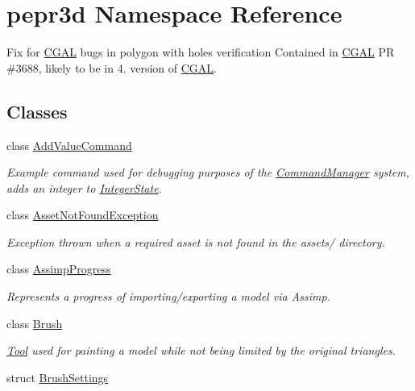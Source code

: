 \hypertarget{namespacepepr3d}{}\section{pepr3d Namespace Reference}
\label{namespacepepr3d}


Fix for \mbox{\hyperlink{namespace_c_g_a_l}{C\+G\+AL}} bugs in polygon with holes verification Contained in \mbox{\hyperlink{namespace_c_g_a_l}{C\+G\+AL}} PR \#3688, likely to be in 4. version of \mbox{\hyperlink{namespace_c_g_a_l}{C\+G\+AL}}.  


\subsection*{Classes}
\begin{DoxyCompactItemize}
\item 
class \mbox{\hyperlink{classpepr3d_1_1_add_value_command}{Add\+Value\+Command}}
\begin{DoxyCompactList}\small\item\em Example command used for debugging purposes of the \mbox{\hyperlink{classpepr3d_1_1_command_manager}{Command\+Manager}} system, adds an integer to \mbox{\hyperlink{structpepr3d_1_1_integer_state}{Integer\+State}}. \end{DoxyCompactList}\item 
class \mbox{\hyperlink{classpepr3d_1_1_asset_not_found_exception}{Asset\+Not\+Found\+Exception}}
\begin{DoxyCompactList}\small\item\em Exception thrown when a required asset is not found in the assets/ directory. \end{DoxyCompactList}\item 
class \mbox{\hyperlink{classpepr3d_1_1_assimp_progress}{Assimp\+Progress}}
\begin{DoxyCompactList}\small\item\em Represents a progress of importing/exporting a model via Assimp. \end{DoxyCompactList}\item 
class \mbox{\hyperlink{classpepr3d_1_1_brush}{Brush}}
\begin{DoxyCompactList}\small\item\em \mbox{\hyperlink{classpepr3d_1_1_tool}{Tool}} used for painting a model while not being limited by the original triangles. \end{DoxyCompactList}\item 
struct \mbox{\hyperlink{structpepr3d_1_1_brush_settings}{Brush\+Settings}}

\end{DoxyCompactItemize}
